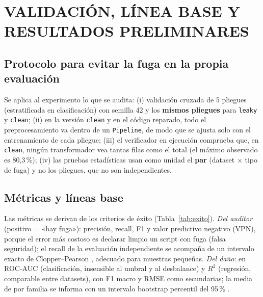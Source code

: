 
\chapter{VALIDACIÓN, LÍNEA BASE Y RESULTADOS PRELIMINARES}
\label{ch:validacion}

\section{Protocolo para evitar la fuga en la propia evaluación}

Se aplica al experimento lo que se audita: (i) validación cruzada de 5 pliegues (estratificada en clasificación) con semilla 42 y los \textbf{mismos pliegues} para \texttt{leaky} y \texttt{clean}; (ii) en la versión \texttt{clean} y en el código reparado, todo el preprocesamiento va dentro de un \texttt{Pipeline}, de modo que se ajusta solo con el entrenamiento de cada pliegue; (iii) el verificador en ejecución comprueba que, en \texttt{clean}, ningún transformador vea tantas filas como el total (el máximo observado es 80,3\,\%); (iv) las pruebas estadísticas usan como unidad el \textbf{par} (dataset $\times$ tipo de fuga) y no los pliegues, que no son independientes.

\section{Métricas y líneas base}

Las métricas se derivan de los criterios de éxito (Tabla~\ref{tab:exito}). \emph{Del auditor} (positivo = «hay fuga»): precisión, recall, F1 y valor predictivo negativo (VPN), porque el error más costoso es declarar limpio un script con fuga (falsa seguridad); el recall de la evaluación independiente se acompaña de un intervalo exacto de Clopper--Pearson \parencite{clopper1934}, adecuado para muestras pequeñas. \emph{Del daño}: \DOpt{} en ROC-AUC (clasificación, insensible al umbral y al desbalance) y $R^2$ (regresión, comparable entre datasets), con F1 macro y RMSE como secundarias; la media de \DOpt{} por familia se informa con un intervalo bootstrap percentil del 95\,\% \parencite{efron1993}.

